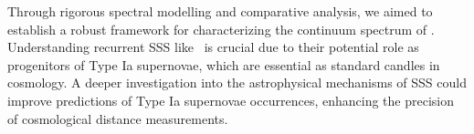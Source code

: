 	Through rigorous spectral modelling and comparative analysis, we aimed to establish a robust framework for characterizing the continuum spectrum of \source. Understanding recurrent SSS like \source\ is crucial due to their potential role as progenitors of Type Ia supernovae, which are essential as standard candles in cosmology. A deeper investigation into the astrophysical mechanisms of SSS could improve predictions of Type Ia supernovae occurrences, enhancing the precision of cosmological distance measurements.	
